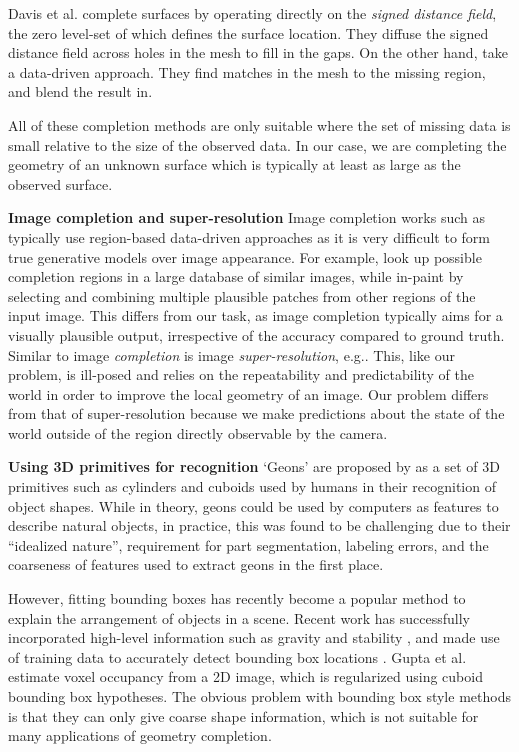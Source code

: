 \documentclass[10pt,twocolumn,letterpaper]{article}
\makeatletter
\renewcommand*{\eg}{e.g.\@\xspace}
\newcommand*{\ea}{et al.\@\xspace}
\makeatother
\begin{document}
Davis \ea \cite{davis-3dpvt-2002} complete surfaces by operating directly on the \emph{signed distance field}, the zero level-set of which defines the surface location. They diffuse the signed distance field across holes in the mesh to fill in the gaps.
On the other hand, \cite{harary-tog-2013} take a data-driven approach.
They find matches in the mesh to the missing region, and blend the result in.

All of these completion methods are only suitable where the set of missing data is small relative to the size of the observed data.
In our case, we are completing the geometry of an unknown surface which is typically at least as large as the observed surface.


\noindent\textbf{Image completion and super-resolution}
Image completion works such as \cite{hays-siggraph-2007, criminisi-cvpr-2003}
typically use region-based data-driven approaches as it is very difficult to form true generative models over image appearance.
For example, \cite{hays-siggraph-2007} look up possible completion regions in a large database of similar images, while \cite{criminisi-cvpr-2003} in-paint by selecting and combining multiple plausible patches from other regions of the input image.
This differs from our task, as image completion typically aims for a visually plausible output, irrespective of the accuracy compared to ground truth.
Similar to image \emph{completion} is image \emph{super-resolution}, \eg \cite{macaodha-eccv-2012}. 
This, like our problem, is ill-posed and relies on the repeatability and predictability of the world in order to improve the local geometry of an image.
Our problem differs from that of super-resolution because we make predictions about the state of the world outside of the region directly observable by the camera.


\noindent\textbf{Using 3D primitives for recognition}
`Geons' are proposed by \cite{bieberman-rbc-1987} as a set of 3D primitives such as cylinders and cuboids used by humans in their recognition of object shapes.
While in theory, geons could be used by computers  as features to describe natural objects, in practice, this was found to be challenging \cite{dickinson-iavc-1997} due to their ``idealized nature'', requirement for part segmentation, labeling errors, and the coarseness of features used to extract geons in the first place.

However, fitting bounding boxes has recently become a popular method to explain the arrangement of objects in a scene.
Recent work has successfully incorporated high-level information such as gravity and stability
 \cite{shao-siggraphasia-2014, jia-cvpr-2013}, and made use of training data to accurately detect bounding box locations \cite{hedau-cvpr-2012}.
Gupta \ea \cite{gupta-cvpr-2011} estimate voxel occupancy from a 2D image, which is regularized using cuboid bounding box hypotheses.
The obvious problem with bounding box style methods is that they can only give coarse shape information, which is not suitable for many applications of geometry completion.
\end{document}
